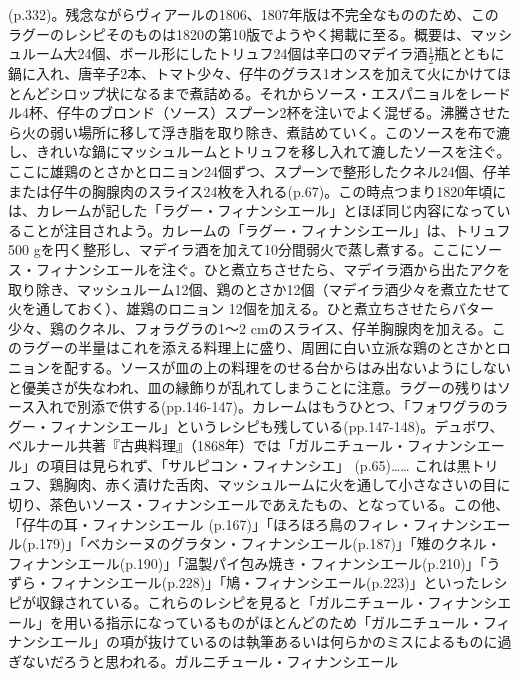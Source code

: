 \begin{recette}
{{{{  (p.332)。残念ながらヴィアールの1806、1807年版は不完全なもののため、このラグーのレシピそのものは1820の第10版でようやく掲載に至る。概要は、マッシュルーム大24個、ボール形にしたトリュフ24個は辛口のマデイラ酒\(\frac{1}{2}\)瓶とともに鍋に入れ、唐辛子2本、トマト少々、仔牛のグラス1オンスを加えて火にかけてほとんどシロップ状になるまで煮詰める。それからソース・エスパニョルをレードル4杯、仔牛のブロンド（ソース）スプーン2杯を注いでよく混ぜる。沸騰させたら火の弱い場所に移して浮き脂を取り除き、煮詰めていく。このソースを布で漉し、きれいな鍋にマッシュルームとトリュフを移し入れて漉したソースを注ぐ。ここに雄鶏のとさかとロニョン24個ずつ、スプーンで整形したクネル24個、仔羊または仔牛の胸腺肉のスライス24枚を入れる(p.67)。この時点つまり1820年頃には、カレームが記した「ラグー・フィナンシエール」とほぼ同じ内容になっていることが注目されよう。カレームの「ラグー・フィナンシエール」は、トリュフ500
  gを円く整形し、マデイラ酒を加えて10分間弱火で蒸し煮する。ここにソース・フィナンシエールを注ぐ。ひと煮立ちさせたら、マデイラ酒から出たアクを取り除き、マッシュルーム12個、鶏のとさか12個（マデイラ酒少々を煮立たせて火を通しておく）、雄鶏のロニョン
  12個を加える。ひと煮立ちさせたらバター少々、鶏のクネル、フォラグラの1〜2
  cmのスライス、仔羊胸腺肉を加える。このラグーの半量はこれを添える料理上に盛り、周囲に白い立派な鶏のとさかとロニョンを配する。ソースが皿の上の料理をのせる台からはみ出ないようにしないと優美さが失なわれ、皿の縁飾りが乱れてしまうことに注意。ラグーの残りはソース入れで別添で供する(pp.146-147)。カレームはもうひとつ、「フォワグラのラグー・フィナンシエール」というレシピも残している(pp.147-148)。デュボワ、ベルナール共著『古典料理』（1868年）では「ガルニチュール・フィナンシエール」の項目は見られず、「サルピコン・フィナンシエ」
  (p.65)\ldots{}\ldots{}
  これは黒トリュフ、鶏胸肉、赤く漬けた舌肉、マッシュルームに火を通して小さなさいの目に切り、茶色いソース・フィナンシエールであえたもの、となっている。この他、「仔牛の耳・フィナンシエール
  (p.167)」「ほろほろ鳥のフィレ・フィナンシエール(p.179)」「ベカシーヌのグラタン・フィナンシエール(p.187)」「雉のクネル・フィナンシエール(p.190)」「温製パイ包み焼き・フィナンシエール(p.210)」「うずら・フィナンシエール(p.228)」「鳩・フィナンシエール(p.223)」といったレシピが収録されている。これらのレシピを見ると「ガルニチュール・フィナンシエール」を用いる指示になっているものがほとんどのため「ガルニチュール・フィナンシエール」の項が抜けているのは執筆あるいは何らかのミスによるものに過ぎないだろうと思われる。}}{ガルニチュール・フィナンシエール}}\label{garniture-a-la-financiere}}



\end{recette}
